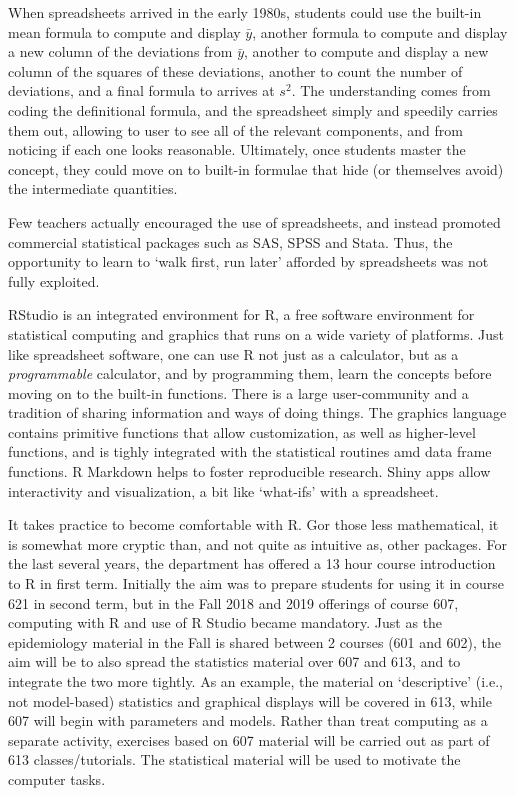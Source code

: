 \documentclass[]{book}
\begin{document}
When spreadsheets arrived in the early 1980s, students could use the built-in mean formula to compute and display \(\bar{y}\), another formula to compute and display a new column of the deviations from \(\bar{y}\), another to compute and display a new column of the squares of these deviations, another to count the number of deviations, and a final formula to arrives at \(s^2.\) The understanding comes from coding the definitional formula, and the spreadsheet simply and speedily carries them out, allowing to user to see all of the relevant components, and from noticing if each one looks reasonable. Ultimately, once students master the concept, they could move on to built-in formulae that hide (or themselves avoid) the intermediate quantities.

Few teachers actually encouraged the use of spreadsheets, and instead promoted commercial statistical packages such as SAS, SPSS and Stata.
Thus, the opportunity to learn to `walk first, run later' afforded by spreadsheets was not fully exploited.

RStudio is an integrated environment for R, a free software environment for statistical computing and graphics that runs on a wide variety of platforms. Just like spreadsheet software, one can use R not just as a calculator, but as a \emph{programmable} calculator, and by programming them, learn the concepts before moving on to the built-in functions. There is a large user-community and a tradition of sharing information and ways of doing things. The graphics language contains primitive functions that allow customization, as well as higher-level functions, and is tighly integrated with the statistical routines amd data frame functions. R Markdown helps to foster reproducible research. Shiny apps allow interactivity and visualization, a bit like `what-ifs' with a spreadsheet.

It takes practice to become comfortable with R. Gor those less mathematical, it is somewhat more cryptic than, and not quite as intuitive as, other packages. For the last several years, the department has offered a 13 hour course introduction to R in first term. Initially the aim was to prepare students for using it in course 621 in second term, but in the Fall 2018 and 2019 offerings of course 607, computing with R and use of R Studio became mandatory. Just as the epidemiology material in the Fall is shared between 2 courses (601 and 602), the aim will be to also spread the statistics material over 607 and 613, and to integrate the two more tightly. As an example, the material on `descriptive' (i.e., not model-based) statistics and graphical displays will be covered in 613, while 607 will begin with parameters and models. Rather than treat computing as a separate activity, exercises based on 607 material will be carried out as part of 613 classes/tutorials. The statistical material will be used to motivate the computer tasks.
\end{document}
